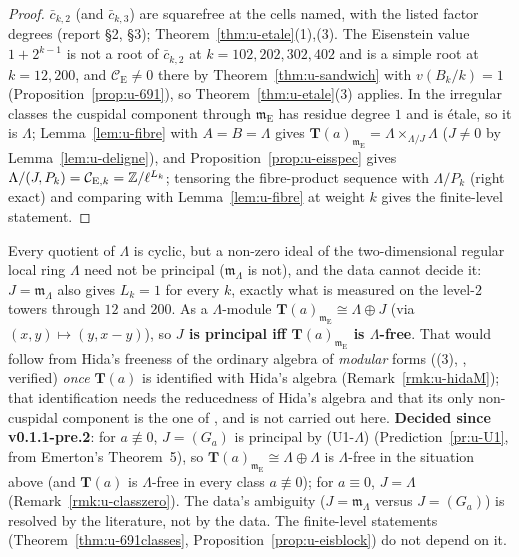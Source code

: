 \documentclass[11pt]{article}
\newcommand{\Iw}{\Lambda}                         %
\newcommand{\Tu}{\mathbf{T}}                      %
\newcommand{\Pk}[1]{P_{#1}}                       %
\newcommand{\Eis}{\mathrm{E}}
\newcommand{\Cg}{\mathcal{C}}                     %
\begin{document}
\begin{proof}
$\bar c_{k,2}$ (and $\bar c_{k,3}$) are squarefree at the cells named, with the listed factor degrees (report \S2, \S3); Theorem~\ref{thm:u-etale}(1),(3).
The Eisenstein value $1+2^{k-1}$ is not a root of $\bar c_{k,2}$ at $k=102,202,302,402$ and is a simple root at $k=12,200$, and $\Cg_\Eis\ne0$ there by
Theorem~\ref{thm:u-sandwich} with $v(B_k/k)=1$ (Proposition~\ref{prop:u-691}), so Theorem~\ref{thm:u-etale}(3) applies. In the irregular classes the cuspidal
component through $\mathfrak m_\Eis$ has residue degree $1$ and is étale, so it is $\Iw$; Lemma~\ref{lem:u-fibre} with $A=B=\Iw$ gives
$\Tu(a)_{\mathfrak m_\Eis}=\Iw\times_{\Iw/J}\Iw$ ($J\ne0$ by Lemma~\ref{lem:u-deligne}), and Proposition~\ref{prop:u-eisspec} gives
$\Iw/(J,\Pk{k})=\Cg_{\Eis,k}=\Z/\ell^{L_k}$; tensoring the fibre-product sequence with $\Iw/\Pk{k}$ (right exact) and comparing with
Lemma~\ref{lem:u-fibre} at weight $k$ gives the finite-level statement.
\end{proof}

\begin{remark}[Is $J$ principal?]\label{rmk:u-Jprincipal}
Every quotient of $\Iw$ is cyclic, but a non-zero ideal of the two-dimensional regular local ring $\Iw$ need not be principal ($\mathfrak m_\Iw$ is not), and the
data cannot decide it: $J=\mathfrak m_\Iw$ also gives $L_k=1$ for every $k$, exactly what is measured on the level-$2$ towers through $12$ and $200$. As a
$\Iw$-module $\Tu(a)_{\mathfrak m_\Eis}\cong\Iw\oplus J$ (via $(x,y)\mapsto(y,x-y)$), so \textbf{$J$ is principal iff $\Tu(a)_{\mathfrak m_\Eis}$ is
$\Iw$-free}. That would follow from Hida's freeness of the ordinary algebra of \emph{modular} forms ((3), \cite[Thm.~3.1]{hida_ens},
verified) \emph{once} $\Tu(a)$ is identified with Hida's algebra (Remark~\ref{rmk:u-hidaM}); that identification needs the reducedness of Hida's algebra and that its
only non-cuspidal component is the one of \cite[Thm.~7.2]{hida_ens}, and is not carried out here. \textbf{Decided since v0.1.1-pre.2}: for
$a\not\equiv0$, $J=(G_a)$ is principal by (U1-$\Iw$) (Prediction~\ref{pr:u-U1}, \PROVED{} from Emerton's Theorem~5), so $\Tu(a)_{\mathfrak m_\Eis}\cong\Iw\oplus\Iw$ is
$\Iw$-free in the situation above (and $\Tu(a)$ is $\Iw$-free in every class $a\not\equiv0$); for $a\equiv0$, $J=\Iw$ (Remark~\ref{rmk:u-classzero}). The data's ambiguity ($J=\mathfrak m_\Iw$ versus $J=(G_a)$) is resolved by the literature,
not by the data. The finite-level statements (Theorem~\ref{thm:u-691classes}, Proposition~\ref{prop:u-eisblock}) do not depend on it.
\end{remark}
\end{document}
